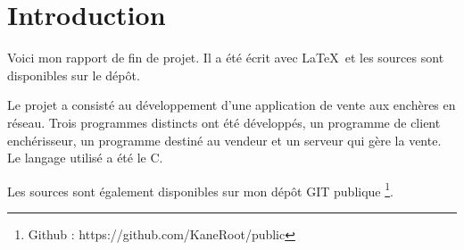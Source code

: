 \chapter{Introduction}

Voici mon rapport de fin de projet.
Il a été écrit avec \LaTeX ~et les sources sont disponibles sur le dépôt.

Le projet a consisté au développement d'une application de vente aux enchères en réseau.
Trois programmes distincts ont été développés, un programme de client enchérisseur, 
un programme destiné au vendeur et un serveur qui gère la vente.
Le langage utilisé a été le C.

Les sources sont également disponibles sur mon dépôt GIT \cite{GIT} publique
\protect\footnote{
Github : https://github.com/KaneRoot/public
}.
